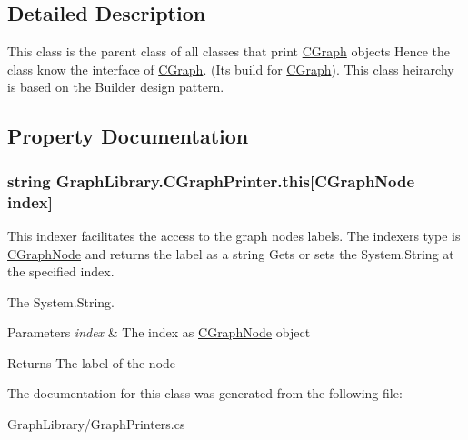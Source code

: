 \subsection{Detailed Description}
This class is the parent class of all classes that print \hyperlink{class_graph_library_1_1_c_graph}{C\+Graph} objects Hence the class know the interface of \hyperlink{class_graph_library_1_1_c_graph}{C\+Graph}. (Its build for \hyperlink{class_graph_library_1_1_c_graph}{C\+Graph}). This class heirarchy is based on the Builder design pattern. 



\subsection{Property Documentation}
\hypertarget{class_graph_library_1_1_c_graph_printer_a51fce717e0bd2b68bf8d96f9c6a98b3c}{}
\subsubsection[{this[C\+Graph\+Node index]}]{\setlength{\rightskip}{0pt plus 5cm}string Graph\+Library.\+C\+Graph\+Printer.\+this\mbox{[}{\bf C\+Graph\+Node} index\mbox{]}\hspace{0.3cm}{\ttfamily [get]}}\label{class_graph_library_1_1_c_graph_printer_a51fce717e0bd2b68bf8d96f9c6a98b3c}


This indexer facilitates the access to the graph nodes labels. The indexer\textquotesingle{}s type is \hyperlink{class_graph_library_1_1_c_graph_node}{C\+Graph\+Node} and returns the label as a string Gets or sets the System.\+String at the specified index. 

The System.\+String. 


\begin{DoxyParams}{Parameters}
{\em index} & The index as \hyperlink{class_graph_library_1_1_c_graph_node}{C\+Graph\+Node} object\\
\hline
\end{DoxyParams}
\begin{DoxyReturn}{Returns}
The label of the node
\end{DoxyReturn}


The documentation for this class was generated from the following file\+:\begin{DoxyCompactItemize}
\item 
Graph\+Library/Graph\+Printers.\+cs\end{DoxyCompactItemize}
